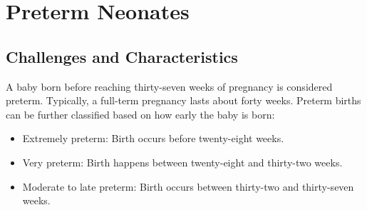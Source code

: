 
\section{Preterm Neonates}
\label{sec:preterm_neonates}



\subsection{Challenges and Characteristics}
\label{subsec:challenges_and_characteristics}


A baby born before reaching thirty-seven weeks of pregnancy is
considered preterm. Typically, a full-term pregnancy lasts about forty
weeks.  Preterm births can be further classified based on how early
the baby is born:

\begin{itemize}
\item Extremely preterm: Birth occurs before twenty-eight weeks.
\item Very preterm: Birth happens between twenty-eight and thirty-two weeks.
\item Moderate to late preterm: Birth occurs between thirty-two and thirty-seven weeks.
\end{itemize}


